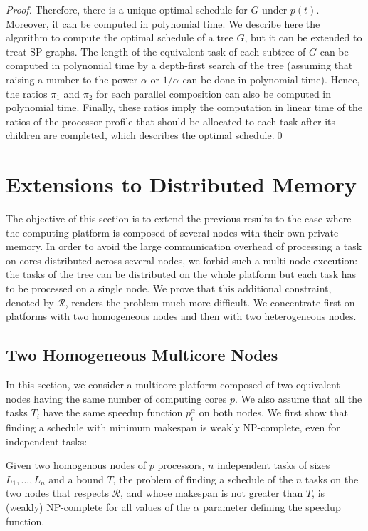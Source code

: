 \documentclass{llncs}
\newcommand{\R}{\ensuremath{\mathcal{R}}\xspace}
\begin{document}
\begin{proof}
  Therefore, there is a unique optimal schedule for $G$ under $p(t)$. Moreover,
  it can be computed in polynomial time. We describe here the algorithm to
  compute the optimal schedule of a tree $G$, but
  it can be extended to treat SP-graphs. The length of the equivalent
  task of each subtree of $G$ can be computed in polynomial time by a
  depth-first search of the tree (assuming that raising a number to the power
  $\alpha$ or $1/\alpha$ can be done in polynomial time). Hence, the ratios
  $\pi_1$ and $\pi_2$ for each parallel composition can also be computed in
  polynomial time. Finally, these ratios imply the computation in linear time of
  the ratios of the processor profile that should be allocated to each task
  after its children are completed, which describes the optimal schedule.\qed
\end{proof}





\section{Extensions to Distributed Memory}
\label{sec:dist}

The objective of this section is to extend the previous results to the
case where the computing platform is composed of several nodes with
their own private memory. In order to avoid the large communication overhead
of processing a task on cores distributed across several
nodes, we forbid such a multi-node execution: the tasks of the tree can
be distributed on the whole platform but each task has to be processed on a
single node. We prove that this additional constraint, denoted by
\R, renders the problem much more difficult. We concentrate first
on platforms with two homogeneous nodes and then with two heterogeneous
nodes.

\subsection{Two Homogeneous Multicore Nodes}
\label{sec:dist-hom}

In this section, we consider a multicore platform composed of two
equivalent nodes having the same number of computing cores $p$. We
also assume that all the tasks $T_i$ have the same speedup function
$p_i^\alpha$ on both nodes.
We first show that finding a schedule with minimum makespan is weakly
NP-complete, even for independent tasks:

\begin{theorem}
  Given two homogenous nodes of $p$ processors, $n$ independent tasks
  of sizes $L_1, ..., L_n$ and a bound $T$, the problem of finding a
  schedule of the $n$ tasks on the two nodes that respects \R, and
  whose makespan is not greater than $T$, is (weakly) NP-complete for
  all values of the $\alpha$ parameter defining the speedup function.
\end{theorem}
\end{document}
